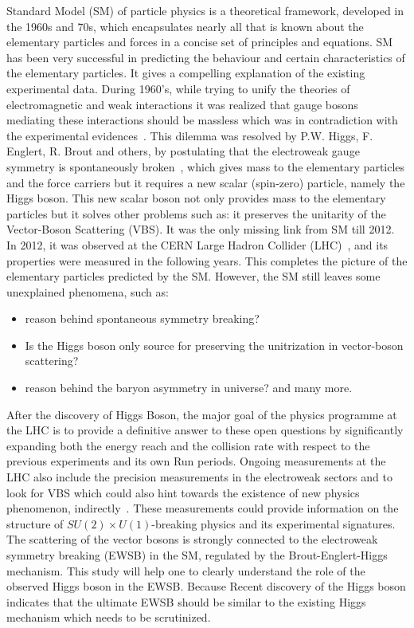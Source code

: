 Standard Model (SM) of particle physics is a theoretical framework, developed in the 1960s and 70s, which encapsulates nearly all that is known about the elementary particles and forces in a concise set of principles and equations. SM has been very successful in predicting the behaviour and certain characteristics of the elementary particles. It gives a compelling explanation of the existing experimental data. During 1960’s, while trying to unify the theories of electromagnetic and weak interactions it was realized that gauge bosons mediating these interactions should be massless which was in contradiction with the  experimental evidences~\cite{StandardModel67_1,StandardModel67_2,StandardModel67_3,}. This dilemma was resolved by P.W. Higgs, F. Englert, R. Brout  and others, by postulating that  the electroweak gauge symmetry is spontaneously broken~\cite{Englert1964,Higgs1964,Higgs1964a,Guralnik1964,Higgs1966,Kibble1967}, which gives mass to the elementary particles and the force carriers but it requires  a new scalar (spin-zero) particle, namely the Higgs boson. This new scalar boson not only provides mass to the elementary particles but it solves other problems such as: it preserves the unitarity of the Vector-Boson Scattering (VBS). It was the only missing link from SM till 2012. In 2012, it was observed at the CERN Large Hadron Collider (LHC)~\cite{Chatrchyan:2012xdj,Aad:2012tfa}, and its properties were measured in the following years. This completes the picture of the elementary particles predicted by the SM. However, the SM still leaves some unexplained phenomena, such as: 
\begin{itemize}
    \item reason behind spontaneous symmetry breaking?
    \item Is the Higgs boson only source for preserving the unitrization in vector-boson scattering? 
    \item reason behind the baryon asymmetry in universe? and many more.
\end{itemize}
After the discovery of Higgs Boson, the major goal of the physics programme at the LHC is to provide a definitive answer to these open questions by significantly expanding both the energy reach and the collision rate with respect to the previous experiments and its own Run periods.
Ongoing measurements at the LHC also include the precision measurements in the electroweak sectors and to look for VBS which could also hint towards the existence of new physics phenomenon, indirectly~\cite{Baak2013}. These measurements could provide information on the structure of $SU(2) \times U(1)$-breaking physics and its experimental signatures. 
The scattering of the vector bosons is strongly connected to the electroweak symmetry breaking (EWSB) in the SM, regulated by the Brout-Englert-Higgs mechanism. This study will help one to clearly understand the role of the observed Higgs boson in the EWSB. Because Recent discovery of the Higgs boson indicates that the ultimate EWSB should be similar to the existing Higgs mechanism which needs to be scrutinized.

